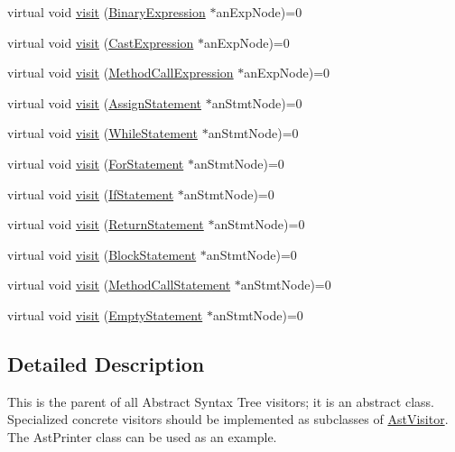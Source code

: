 \begin{DoxyCompactItemize}
virtual void \hyperlink{classAstVisitor_a9b135e2823d8aab8a832478fd90ebf8c}{visit} (\hyperlink{classBinaryExpression}{BinaryExpression} $\ast$anExpNode)=0
\item 
virtual void \hyperlink{classAstVisitor_a2b90ef6f1a66a690b66c03b700a5a6bf}{visit} (\hyperlink{classCastExpression}{CastExpression} $\ast$anExpNode)=0
\item 
virtual void \hyperlink{classAstVisitor_af1b565438e63e492a6696a7ee0872815}{visit} (\hyperlink{classMethodCallExpression}{MethodCallExpression} $\ast$anExpNode)=0
\item 
virtual void \hyperlink{classAstVisitor_a44bb2ee3b317cd859760b2a747a26dfd}{visit} (\hyperlink{classAssignStatement}{AssignStatement} $\ast$anStmtNode)=0
\item 
virtual void \hyperlink{classAstVisitor_ac1272bbe5b7c9b604cfd112001cbafa8}{visit} (\hyperlink{classWhileStatement}{WhileStatement} $\ast$anStmtNode)=0
\item 
virtual void \hyperlink{classAstVisitor_a04ab246b6b4f982075744cb79d9e3d83}{visit} (\hyperlink{classForStatement}{ForStatement} $\ast$anStmtNode)=0
\item 
virtual void \hyperlink{classAstVisitor_a013c3bcd69e558c3b5a1d129d7943dc3}{visit} (\hyperlink{classIfStatement}{IfStatement} $\ast$anStmtNode)=0
\item 
virtual void \hyperlink{classAstVisitor_a67d9b772dd6c8c7d0b95f13f06a94fcd}{visit} (\hyperlink{classReturnStatement}{ReturnStatement} $\ast$anStmtNode)=0
\item 
virtual void \hyperlink{classAstVisitor_a5599e57d09e99f818cc1e1b484e1616a}{visit} (\hyperlink{classBlockStatement}{BlockStatement} $\ast$anStmtNode)=0
\item 
virtual void \hyperlink{classAstVisitor_a157fd3ed798acf5a3694bb045a4e83c5}{visit} (\hyperlink{classMethodCallStatement}{MethodCallStatement} $\ast$anStmtNode)=0
\item 
virtual void \hyperlink{classAstVisitor_ae4a605acd038f5983b70edb8f1d51ea2}{visit} (\hyperlink{classEmptyStatement}{EmptyStatement} $\ast$anStmtNode)=0
\end{DoxyCompactItemize}


\subsection{Detailed Description}
This is the parent of all Abstract Syntax Tree visitors; it is an abstract class. Specialized concrete visitors should be implemented as subclasses of \hyperlink{classAstVisitor}{AstVisitor}. The AstPrinter class can be used as an example. 

